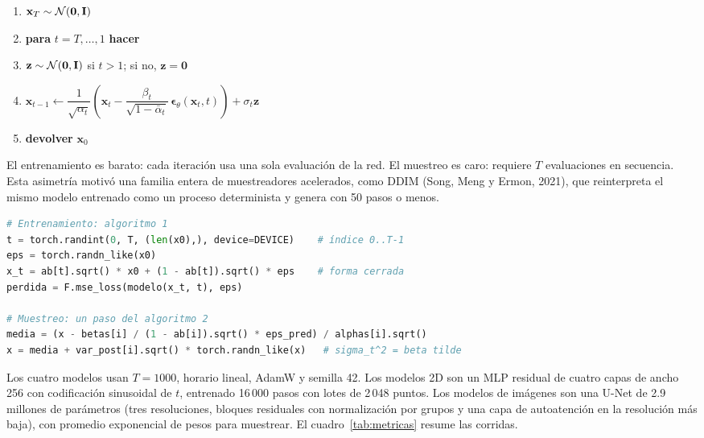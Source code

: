 \documentclass[11pt,letterpaper,oneside]{report}
\newcommand{\xb}{\mathbf{x}}
\newcommand{\zb}{\mathbf{z}}
\newcommand{\Ib}{\mathbf{I}}
\newcommand{\ab}{\bar{\alpha}}
\newcommand{\epst}{\boldsymbol{\epsilon}_\theta}
\newenvironment{algoritmo}[1]{\begin{tcolorbox}[enhanced, breakable, arc=2pt, boxrule=0.8pt,
  colframe=anahuac, colback=white, coltitle=white, colbacktitle=anahuac,
  fonttitle=\sffamily\bfseries, title={#1}, left=8pt, right=8pt]\begin{enumerate}[label=\textsf{\color{anahuacosc}\arabic*:}, leftmargin=2em]}
  {\end{enumerate}\end{tcolorbox}}
\begin{document}
\begin{algoritmo}{Algoritmo 2. Muestreo (rebobinar el video)}
  \item $\xb_T\sim\Normal(\mathbf 0,\Ib)$
  \item \textbf{para} $t=T,\dots,1$ \textbf{hacer}
  \item \quad $\zb\sim\Normal(\mathbf 0,\Ib)$ si $t>1$; si no, $\zb=\mathbf 0$
  \item \quad $\xb_{t-1}\leftarrow\dfrac{1}{\sqrt{\alpha_t}}\left(\xb_t-\dfrac{\beta_t}{\sqrt{1-\ab_t}}\,\epst(\xb_t,t)\right)+\sigma_t\zb$
  \item \textbf{devolver} $\xb_0$
\end{algoritmo}

El entrenamiento es barato: cada iteración usa una sola evaluación de la red. El muestreo es caro: requiere $T$ evaluaciones en secuencia. Esta asimetría motivó una familia entera de muestreadores acelerados, como DDIM (Song, Meng y Ermon, 2021), que reinterpreta el mismo modelo entrenado como un proceso determinista y genera con 50 pasos o menos.

\begin{lstlisting}[language=Python, caption={El corazón de \texttt{scripts/train\_ddpm.py}: una iteración de entrenamiento y un paso de muestreo.}]
# Entrenamiento: algoritmo 1
t = torch.randint(0, T, (len(x0),), device=DEVICE)    # índice 0..T-1
eps = torch.randn_like(x0)
x_t = ab[t].sqrt() * x0 + (1 - ab[t]).sqrt() * eps    # forma cerrada
perdida = F.mse_loss(modelo(x_t, t), eps)

# Muestreo: un paso del algoritmo 2
media = (x - betas[i] / (1 - ab[i]).sqrt() * eps_pred) / alphas[i].sqrt()
x = media + var_post[i].sqrt() * torch.randn_like(x)   # sigma_t^2 = beta tilde
\end{lstlisting}

\begin{nota}
Los cuatro modelos usan $T=1000$, horario lineal, AdamW y semilla 42. Los modelos 2D son un MLP residual de cuatro capas de ancho 256 con codificación sinusoidal de $t$, entrenado 16\,000 pasos con lotes de 2\,048 puntos. Los modelos de imágenes son una U-Net de 2.9 millones de parámetros (tres resoluciones, bloques residuales con normalización por grupos y una capa de autoatención en la resolución más baja), con promedio exponencial de pesos para muestrear. El cuadro~\ref{tab:metricas} resume las corridas.
\end{nota}


\end{document}
